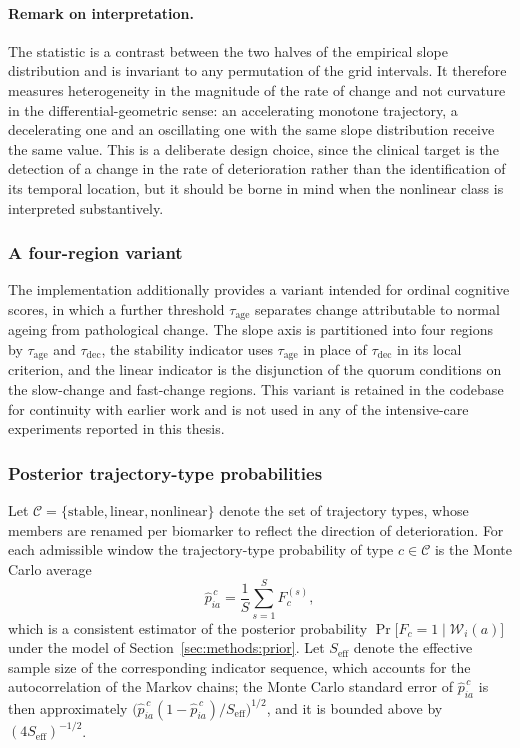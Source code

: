 \paragraph{Remark on interpretation.} The statistic is a contrast between the two halves of the empirical slope distribution and is invariant to any permutation of the grid intervals. It therefore measures heterogeneity in the magnitude of the rate of change and not curvature in the differential-geometric sense: an accelerating monotone trajectory, a decelerating one and an oscillating one with the same slope distribution receive the same value. This is a deliberate design choice, since the clinical target is the detection of a change in the rate of deterioration rather than the identification of its temporal location, but it should be borne in mind when the nonlinear class is interpreted substantively.

\subsubsection{A four-region variant}

The implementation additionally provides a variant intended for ordinal cognitive scores, in which a further threshold $\tau_{\mathrm{age}}$ separates change attributable to normal ageing from pathological change. The slope axis is partitioned into four regions by $\tau_{\mathrm{age}}$ and $\tau_{\mathrm{dec}}$, the stability indicator uses $\tau_{\mathrm{age}}$ in place of $\tau_{\mathrm{dec}}$ in its local criterion, and the linear indicator is the disjunction of the quorum conditions on the slow-change and fast-change regions. This variant is retained in the codebase for continuity with earlier work and is not used in any of the intensive-care experiments reported in this thesis.

\subsubsection{Posterior trajectory-type probabilities}

Let $\mathcal{C}=\{\mathrm{stable},\mathrm{linear},\mathrm{nonlinear}\}$ denote the set of trajectory types, whose members are renamed per biomarker to reflect the direction of deterioration. For each admissible window the trajectory-type probability of type $c\in\mathcal{C}$ is the Monte Carlo average
$$\hat{p}^{\,c}_{ia}=\frac{1}{S}\sum_{s=1}^{S}F^{(s)}_c,$$
which is a consistent estimator of the posterior probability $\Pr\bigl[F_c=1\mid\mathcal{W}_i(a)\bigr]$ under the model of Section~\ref{sec:methods:prior}. Let $S_{\mathrm{eff}}$ denote the effective sample size of the corresponding indicator sequence, which accounts for the autocorrelation of the Markov chains; the Monte Carlo standard error of $\hat{p}^{\,c}_{ia}$ is then approximately $\bigl(\hat{p}^{\,c}_{ia}(1-\hat{p}^{\,c}_{ia})/S_{\mathrm{eff}}\bigr)^{1/2}$, and it is bounded above by $(4S_{\mathrm{eff}})^{-1/2}$.

